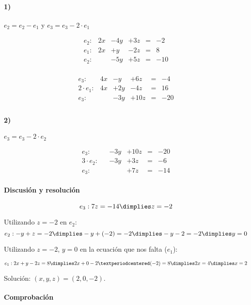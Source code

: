 \documentclass[palatino,nosec]{Docencia}
\begin{document}
\begin{problem}
\paragraph{1)} $e_2 = e_2-e_1$ y $e_3 = e_3-2·e_1$

\[
\begin{array}{rccccc}
e_2: &	2x &	-	4y &	+ 3z &	= & -2 \\
e_1: &	2x &	+	y  &	- 2z &	= & 8 \\
\hline
e_2: &	   &	-	5y &	+ 5z &	= & -10\\
\end{array}
\]	


\[
\begin{array}{rccccc}
e_3:   &	4x &	-	y   &	+ 6z &	= & -4 \\
2·e_1: &	4x &	+	2y  &	- 4z &	= & 16 \\
\hline
e_3:   &	   &	-	3y &	+ 10z &	= & -20\\
\end{array}
\]	


\paragraph{2)} $e_3 = e_3-2·e_2$

\[
\begin{array}{rccccc}
e_3: &	   &	-	3y &	+ 10z &	= & -20\\
3·e_2: &   &	-	3y &	+  3z &	= & -6\\
\hline
e_3: &	   &		   &	+  7z & = &-14
\end{array}
\]	


\paragraph{Discusión y resolución}

\[e_3: 7z=-14 \dimplies z=-2\]


Utilizando $z=-2$ en $e_2$:
\[e_2: -y+z=-2 \dimplies -y + (-2) = -2 \dimplies -y-2=-2 \dimplies y=0\]

Utilizando $z=-2$, $y=0$ en la ecuación que nos falta ($e_1$):

\[
e_1: 2x	+ y - 2z = 8 \dimplies 2x + 0 - 2·(-2) = 8 \dimplies 2x=4 \dimplies x=2
\]


Solución: $(x,y,z) = (2,0,-2)$.

\paragraph{Comprobación}


\end{problem}
\end{document}

